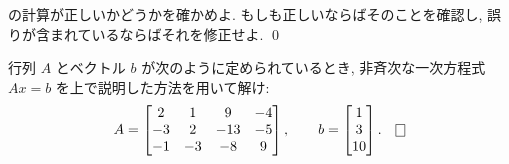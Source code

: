 \documentclass[12pt,twoside]{jarticle}
\begin{document}
\begin{question}
  の計算が正しいかどうかを確かめよ.
  もしも正しいならばそのことを確認し, 誤りが含まれているならばそれを修正せよ.
  \qed
\end{question}


\begin{question}
  \label{q:sol-inhom-1}
  行列 $A$ とベクトル $b$ が次のように定められているとき, 
  非斉次な一次方程式 $Ax=b$ を上で説明した方法を用いて解け:
  \begin{equation*}
    A = 
    \begin{bmatrix}
       2 &  1 &   9 & -4 \\
      -3 &  2 & -13 & -5 \\
      -1 & -3 &  -8 &  9 \\
    \end{bmatrix},
    \qquad
    b =
    \begin{bmatrix}
       1 \\
       3 \\
      10 \\
    \end{bmatrix}.
    \qed
  \end{equation*}
\end{question}
\end{document}
